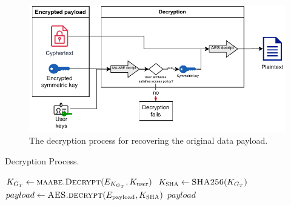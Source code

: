 \documentclass[cic,tc,english]{iiufrgs}
\numberwithin{algorithm}{chapter}
\begin{document}
        \begin{figure}[h]
            \centering
            \includegraphics[width=\textwidth]{images/diagrams/decryption_diagram.pdf} %
            \caption{The decryption process for recovering the original data payload.}
            \label{fig:decryption_diagram}
        \end{figure}

        \begin{algorithm}[h]
            \caption{Decryption Process.}
            \label{alg:decryption_process}
            \begin{algorithmic}[1]
                \State $K_{G_T} \gets \textsc{maabe.Decrypt}(E_{K_{G_T}}, K_{\text{user}})$
                \State $K_{\textsc{SHA}} \gets \textsc{SHA256}(K_{G_T})$
                \State $payload \gets \textsc{AES.decrypt}(E_{\text{payload}}, K_{\textsc{SHA}})$
                \State \Return $payload$
            \EndProcedure
            \end{algorithmic}
        \end{algorithm}


\end{document}

